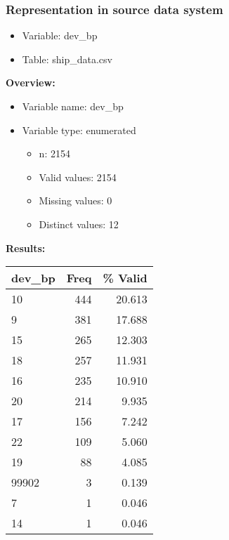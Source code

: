 \documentclass[
]{article}
\providecommand{\tightlist}{%
  \setlength{\itemsep}{0pt}\setlength{\parskip}{0pt}}
\begin{document}
\hypertarget{representation-in-source-data-system-5}{%
\subsubsection{\texorpdfstring{Representation in \textbf{source} data
system}{Representation in source data system}}\label{representation-in-source-data-system-5}}

\begin{itemize}
\tightlist
\item
  Variable: dev\_bp
\item
  Table: ship\_data.csv
\end{itemize}

\textbf{Overview:}

\begin{itemize}
\tightlist
\item
  Variable name: dev\_bp
\item
  Variable type: enumerated

  \begin{itemize}
  \tightlist
  \item
    n: 2154
  \item
    Valid values: 2154
  \item
    Missing values: 0
  \item
    Distinct values: 12
  \end{itemize}
\end{itemize}

\textbf{Results:}\\

\begin{table}[H]
\centering
\begin{tabular}{l|r|r}
\hline
\textbf{dev\_bp} & \textbf{Freq} & \textbf{\% Valid}\\
\hline
10 & 444 & 20.613\\
\hline
9 & 381 & 17.688\\
\hline
15 & 265 & 12.303\\
\hline
18 & 257 & 11.931\\
\hline
16 & 235 & 10.910\\
\hline
20 & 214 & 9.935\\
\hline
17 & 156 & 7.242\\
\hline
22 & 109 & 5.060\\
\hline
19 & 88 & 4.085\\
\hline
99902 & 3 & 0.139\\
\hline
7 & 1 & 0.046\\
\hline
14 & 1 & 0.046\\
\hline
\end{tabular}
\end{table}
\end{document}
